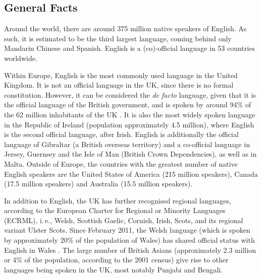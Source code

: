 \documentclass[]{../../metanetpaper}
\begin{document}
\clearpage


\begin{multicols}{2}

\subsection{General Facts}

Around the world, there are around 375 million native speakers of English. As such, it is estimated to be the third largest language, coming behind only Mandarin Chinese and Spanish. English is a (co)-official language in 53 countries worldwide.   
    
Within Europe, English is the most commonly used language in the United Kingdom. It is not an official language in the UK, since there is no formal constitution. However, it can be considered the \textit{de facto} language, given that it is the official language of the British government, and is spoken by around 94\% of the 62 million inhabitants of the UK \cite{Leg1}. It is also the most widely spoken language in the Republic of Ireland (population approximately 4.5 million), where English is the second official language, after Irish.  English is additionally the official language of Gibraltar (a British overseas territory) and a co-official language in Jersey, Guernsey and the Isle of Man (British Crown Dependencies), as well as in Malta. Outside of Europe, the countries with the greatest number of native English speakers are the United States of America (215 million speakers), Canada (17.5 million speakers) and Australia (15.5 million speakers).
    
In addition to English, the UK has further recognised regional languages, according to the European Charter for Regional or Minority Languages (ECRML), i.\,e., Welsh, Scottish Gaelic, Cornish, Irish, Scots, and its regional variant Ulster Scots. Since February 2011, the Welsh language (which is spoken by approximately 20\% of the population of Wales) has shared official status with English in Wales \cite{Leg2}.  The large number of British Asians (approximately 2.3 million or 4\% of the population, according to the 2001 census) give rise to other languages being spoken in the UK, most notably Punjabi and Bengali. 
    

\end{multicols}
\end{document}
